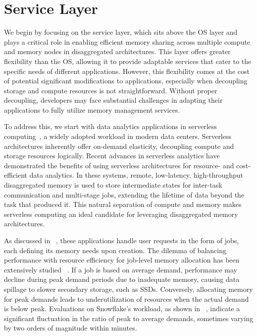 \chapter{Service Layer}
\label{chap:service}


We begin by focusing on the service layer, which sits above the OS layer and plays a critical role in enabling efficient memory sharing across multiple compute and memory nodes in disaggregated architectures. This layer offers greater flexibility than the OS, allowing it to provide adaptable services that cater to the specific needs of different applications. However, this flexibility comes at the cost of potential significant modifications to applications, especially when decoupling storage and compute resources is not straightforward. Without proper decoupling, developers may face substantial challenges in adapting their applications to fully utilize memory management services.

To address this, we start with data analytics applications in serverless computing~\cite{starling, locus, pocket, flint, sparkonlambda, cirrus, excamera, pywren, numpywren, gg, athena, aurora, azuresqldw, cloudburst, snowset, caerus}, a widely adopted workload in modern data centers. Serverless architectures inherently offer on-demand elasticity, decoupling compute and storage resources logically. Recent advances in serverless analytics have demonstrated the benefits of using serverless architectures for resource- and cost-efficient data analytics. In these systems, remote, low-latency, high-throughput disaggregated memory is used to store intermediate states for inter-task communication and multi-stage jobs, extending the lifetime of data beyond the task that produced it. This natural separation of compute and memory makes serverless computing an ideal candidate for leveraging disaggregated memory architectures.

As discussed in ~\cite{starling, shuffling, pocket, cirrus}, these applications handle user requests in the form of jobs, each defining its memory needs upon creation. The dilemma of balancing performance with resource efficiency for job-level memory allocation has been extensively studied ~\cite{elasticquery, qoop}. If a job is based on average demand, performance may decline during peak demand periods due to inadequate memory, causing data spillage to slower secondary storage, such as SSDs. Conversely, allocating memory for peak demands leads to underutilization of resources when the actual demand is below peak. Evaluations on Snowflake's workload, as shown in ~\cite{elasticquery}, indicate a significant fluctuation in the ratio of peak to average demands, sometimes varying by two orders of magnitude within minutes.

